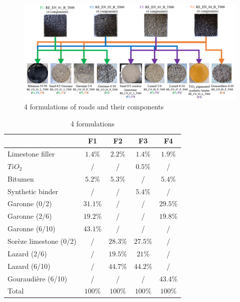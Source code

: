 \begin{figure}[!tb]
    \centering
    \includegraphics[width=1\linewidth]{./figures/spectral-brdf-measurements/all-roads.png}
    \caption{4 formulations of roads and their components}
    \label{fig:all-roads}
\end{figure}


\begin{table}[h]
    \centering
    \caption{4 formulations}
    \label{tab:4-formulations}
    \begin{tabular}{lcccc}
        \hline
        \hline
                               & F1       & F2       & F3       & F4       \\
        \hline
        Limestone filler       & $1.4\%$  & $2.2\%$  & $1.4\%$  & $1.9\%$  \\
        \hline
        $TiO_2$                & /        & /        & $0.5\%$  & /        \\
        \hline
        Bitumen                & $5.2\%$  & $5.3\%$  & /        & $5.4\%$  \\
        \hline
        Synthetic binder       & /        & /        & $5.4\%$  & /        \\
        \hline
        Garonne (0/2)          & $31.1\%$ & /        & /        & $29.5\%$ \\
        \hline
        Garonne (2/6)          & $19.2\%$ & /        & /        & $19.8\%$ \\
        \hline
        Garonne (6/10)         & $43.1\%$ & /        & /        & /        \\
        \hline
        Sorèze limestone (0/2) & /        & $28.3\%$ & $27.5\%$ & /        \\
        \hline
        Lazard (2/6)           & /        & $19.5\%$ & $21\%$   & /        \\
        \hline
        Lazard (6/10)          & /        & $44.7\%$ & $44.2\%$ & /        \\
        \hline
        Gouraudière (6/10)     & /        & /        & /        & $43.4\%$ \\
        \hline
        Total                  & $100\%$  & $100\%$  & $100\%$  & $100\%$  \\
        \hline
        \hline
    \end{tabular}
\end{table}

